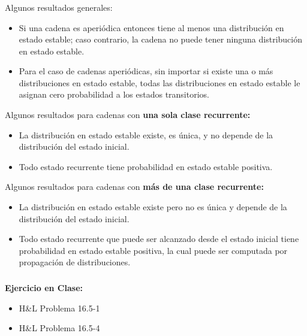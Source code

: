 \documentclass[ 10pt, xcolor = dvipsnames]{beamer}
\begin{document}
\begin{frame}[allowframebreaks]
\frametitle{\insertsubsection}

Algunos resultados generales:
\begin{itemize}
\item Si una cadena es aperi\'odica entonces tiene al menos una distribuci\'on en estado estable; caso contrario, la cadena no puede tener ninguna \linebreak distribuci\'on en estado estable. 
\item Para el caso de cadenas aperi\'odicas, sin importar si existe una o m\'as distribuciones en estado estable, todas las distribuciones en estado estable \linebreak le asignan cero probabilidad a los estados transitorios. 
\end{itemize}

Algunos resultados para cadenas con \textbf{una sola clase recurrente:}
\begin{itemize}
\item La distribuci\'on en estado estable existe, es \'unica, y no depende de la distribuci\'on del estado inicial. 
\item Todo estado recurrente tiene probabilidad en estado estable positiva. 
\end{itemize}
\framebreak

Algunos resultados para cadenas con \textbf{m\'as de una clase recurrente:}
\begin{itemize}
\item La distribuci\'on en estado estable existe pero no es \'unica y depende de la distribuci\'on del estado inicial. 
\item Todo estado recurrente que puede ser alcanzado desde el estado inicial \linebreak tiene probabilidad en estado estable positiva, la cual puede ser computada por propagaci\'on de distribuciones. 
\end{itemize}

\end{frame}

\begin{frame}[allowframebreaks]
\frametitle{\insertsubsection}

\textbf{Ejercicio en Clase:}
\begin{itemize}
\item H\&L Problema 16.5-1
\item H\&L Problema 16.5-4
\end{itemize}
\fullskip

\end{frame}
\end{document}
